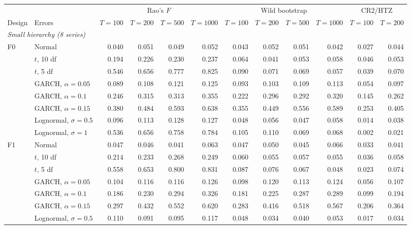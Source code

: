 \centering\footnotesize\setlength{\tabcolsep}{4pt}
\begin{tabular}{llrrrrrrrrrr}
\hline
 & & \multicolumn{4}{c}{Rao's $F$} & \multicolumn{4}{c}{Wild bootstrap} & \multicolumn{2}{c}{CR2/HTZ} \\
Design & Errors & $T = 100$ & $T = 200$ & $T = 500$ & $T = 1000$ & $T = 100$ & $T = 200$ & $T = 500$ & $T = 1000$ & $T = 100$ & $T = 200$ \\
\hline
\multicolumn{12}{l}{\emph{Small hierarchy (8 series)}} \\
F0 & Normal & 0.040 & 0.051 & 0.049 & 0.052 & 0.043 & 0.052 & 0.051 & 0.042 & 0.027 & 0.044 \\
 & $t$, 10 df & 0.194 & 0.226 & 0.230 & 0.237 & 0.064 & 0.041 & 0.053 & 0.058 & 0.046 & 0.053 \\
 & $t$, 5 df & 0.546 & 0.656 & 0.777 & 0.825 & 0.090 & 0.071 & 0.069 & 0.057 & 0.039 & 0.070 \\
 & GARCH, $\alpha = 0.05$ & 0.089 & 0.108 & 0.121 & 0.125 & 0.093 & 0.103 & 0.109 & 0.113 & 0.054 & 0.097 \\
 & GARCH, $\alpha = 0.1$ & 0.246 & 0.315 & 0.313 & 0.355 & 0.222 & 0.296 & 0.292 & 0.320 & 0.145 & 0.262 \\
 & GARCH, $\alpha = 0.15$ & 0.380 & 0.484 & 0.593 & 0.638 & 0.355 & 0.449 & 0.556 & 0.589 & 0.253 & 0.405 \\
 & Lognormal, $\sigma = 0.5$ & 0.096 & 0.113 & 0.128 & 0.127 & 0.048 & 0.056 & 0.047 & 0.058 & 0.014 & 0.038 \\
 & Lognormal, $\sigma = 1$ & 0.536 & 0.656 & 0.758 & 0.784 & 0.105 & 0.110 & 0.069 & 0.068 & 0.002 & 0.021 \\
F1 & Normal & 0.047 & 0.046 & 0.041 & 0.063 & 0.047 & 0.050 & 0.045 & 0.066 & 0.033 & 0.041 \\
 & $t$, 10 df & 0.214 & 0.233 & 0.268 & 0.249 & 0.060 & 0.055 & 0.057 & 0.055 & 0.036 & 0.058 \\
 & $t$, 5 df & 0.558 & 0.653 & 0.800 & 0.831 & 0.087 & 0.076 & 0.067 & 0.048 & 0.023 & 0.074 \\
 & GARCH, $\alpha = 0.05$ & 0.104 & 0.116 & 0.116 & 0.126 & 0.098 & 0.120 & 0.113 & 0.124 & 0.056 & 0.107 \\
 & GARCH, $\alpha = 0.1$ & 0.186 & 0.230 & 0.294 & 0.326 & 0.181 & 0.225 & 0.287 & 0.289 & 0.099 & 0.194 \\
 & GARCH, $\alpha = 0.15$ & 0.297 & 0.432 & 0.552 & 0.620 & 0.283 & 0.416 & 0.518 & 0.567 & 0.206 & 0.364 \\
 & Lognormal, $\sigma = 0.5$ & 0.110 & 0.091 & 0.095 & 0.117 & 0.048 & 0.034 & 0.040 & 0.053 & 0.017 & 0.034 \\

\end{tabular}
